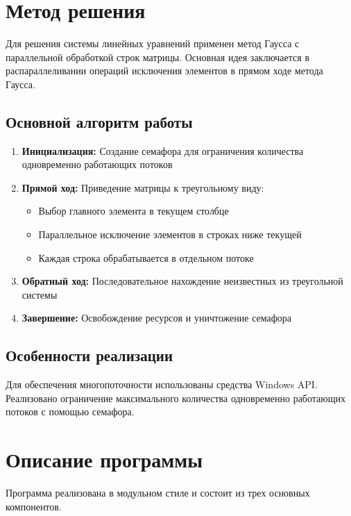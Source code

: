 \section{Метод решения}

Для решения системы линейных уравнений применен метод Гаусса с параллельной обработкой строк матрицы. Основная идея заключается в распараллеливании операций исключения элементов в прямом ходе метода Гаусса.

\subsection{Основной алгоритм работы}
\begin{enumerate}
    \item \textbf{Инициализация:} Создание семафора для ограничения количества одновременно работающих потоков
    \item \textbf{Прямой ход:} Приведение матрицы к треугольному виду:
    \begin{itemize}
        \item Выбор главного элемента в текущем столбце
        \item Параллельное исключение элементов в строках ниже текущей
        \item Каждая строка обрабатывается в отдельном потоке
    \end{itemize}
    \item \textbf{Обратный ход:} Последовательное нахождение неизвестных из треугольной системы
    \item \textbf{Завершение:} Освобождение ресурсов и уничтожение семафора
\end{enumerate}

\subsection{Особенности реализации}
Для обеспечения многопоточности использованы средства Windows API. Реализовано ограничение максимального количества одновременно работающих потоков с помощью семафора.

\section{Описание программы}

Программа реализована в модульном стиле и состоит из трех основных компонентов.

